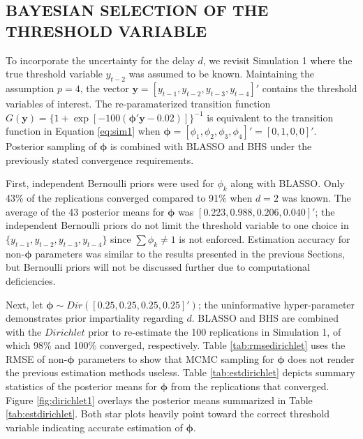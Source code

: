 \vskip 3mm

\subsection{BAYESIAN SELECTION OF THE THRESHOLD VARIABLE}

To incorporate the uncertainty for the delay $d$, we revisit Simulation 1 where the true threshold variable $y_{t-2}$ was assumed to be known. Maintaining the assumption $p = 4$, the vector $\bm{y}=[y_{t-1},y_{t-2},y_{t-3},y_{t-4}]'$ contains the threshold variables of interest. The re-paramaterized transition function $G(\bm{y})=\{1+\exp[-100(\bm{\phi}'\bm{y}-0.02)]\}^{-1}$ is equivalent to the transition function in Equation \ref{eq:sim1} when $\bm{\phi}=[\phi_1,\phi_2,\phi_3,\phi_4]'=[0,1,0,0]'$. Posterior sampling of $\bm{\phi}$ is combined with BLASSO and BHS under the previously stated convergence requirements. 

First, independent Bernoulli priors were used for $\phi_k$ along with BLASSO. Only 43\% of the replications converged compared to 91\% when $d=2$ was known. The average of the 43 posterior means for $\bm{\phi}$ was $[0.223,0.988,0.206,0.040]'$; the independent Bernoulli priors do not limit the threshold variable to one choice in  $\{y_{t-1},y_{t-2},y_{t-3},y_{t-4}\}$ since $\sum \phi_k \neq 1$ is not enforced. Estimation accuracy for non-$\bm{\phi}$ parameters was similar to the results presented in the previous Sections, but Bernoulli priors will not be discussed further due to computational deficiencies.

Next, let $\bm{\phi}\sim Dir([0.25,0.25,0.25,0.25]')$; the uninformative hyper-parameter demonstrates prior impartiality regarding $d$. BLASSO and BHS are combined with the $Dirichlet$ prior to re-estimate the 100 replications in Simulation 1, of which 98\% and 100\% converged, respectively. Table \ref{tab:rmsedirichlet} uses the RMSE of non-$\bm{\phi}$ parameters to show that MCMC sampling for $\bm{\phi}$ does not render the previous estimation methods useless. Table \ref{tab:estdirichlet} depicts summary statistics of the posterior means for $\bm{\phi}$ from the replications that converged. Figure \ref{fig:dirichlet1} overlays the posterior means summarized in Table \ref{tab:estdirichlet}. Both star plots heavily point toward the correct threshold variable indicating accurate estimation of $\bm{\phi}$. 
 
